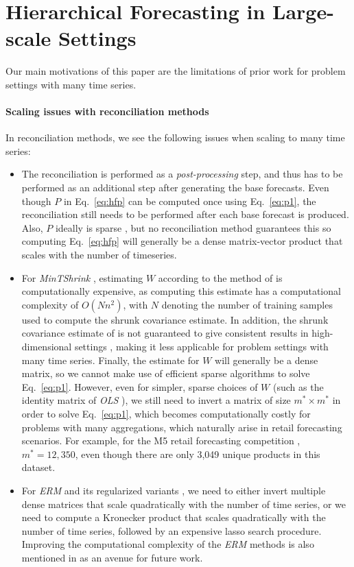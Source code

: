 \documentclass[preprint, 3p, times, twocolumn]{elsarticle}
\begin{document}
\section{Hierarchical Forecasting in Large-scale Settings}   \label{sec:ourwork}
Our main motivations of this paper are the limitations of prior work for problem settings with many time series.

\paragraph{Scaling issues with reconciliation methods} \label{sec:scalingissuesreconmethods}
In reconciliation methods, we see the following issues when scaling to many time series:
\begin{itemize}
  \item The reconciliation is performed as a \textit{post-processing} step, and thus has to be performed as an additional step after generating the base forecasts. Even though \(P\) in Eq.~\ref{eq:hfp} can be computed once using Eq.~\eqref{eq:p1}, the reconciliation still needs to be performed after each base forecast is produced. Also, \(P\) ideally is sparse \cite{bentaieb_regularized_2019}, but no reconciliation method guarantees this so computing Eq.~\ref{eq:hfp} will generally be a dense matrix-vector product that scales with the number of timeseries.
  \item For \textit{MinTShrink} \cite{wickramasuriya_optimal_2019}, estimating \(W\) according to the method of \cite{schafer_shrinkage_2005} is computationally expensive, as computing this estimate has a computational complexity of \(O(Nn^2)\), with \(N\) denoting the number of training samples used to compute the shrunk covariance estimate. In addition, the shrunk covariance estimate of \cite{schafer_shrinkage_2005} is not guaranteed to give consistent results in high-dimensional settings \cite{touloumis_nonparametric_2015}, making it less applicable for problem settings with many time series. Finally, the estimate for \(W\) will generally be a dense matrix, so we cannot make use of efficient sparse algorithms to solve Eq.~\eqref{eq:p1}. However, even for simpler, sparse choices of \(W\) (such as the identity matrix of \textit{OLS} \cite{hyndman_optimal_2011}), we still need to invert a matrix of size \(m^* \times m^*\) in order to solve Eq.~\eqref{eq:p1}, which becomes computationally costly for problems with many aggregations, which naturally arise in retail forecasting scenarios. For example, for the M5 retail forecasting competition \cite{makridakis_m5_2021}, \(m^*=12,350\), even though there are only 3,049 unique products in this dataset.  
  \item For \textit{ERM} and its regularized variants \cite{bentaieb_regularized_2019}, we need to either invert multiple dense matrices that scale quadratically with the number of time series, or we need to compute a Kronecker product that scales quadratically with the number of time series, followed by an expensive lasso search procedure. Improving the computational complexity of the \textit{ERM} methods is also mentioned in \cite{bentaieb_regularized_2019} as an avenue for future work.
\end{itemize}
\end{document}
